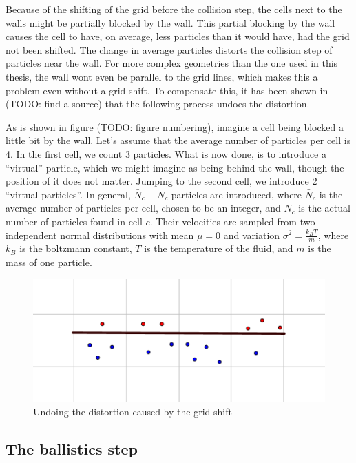 \documentclass[
]{article}
\begin{document}
Because of the shifting of the grid before the collision step, the cells
next to the walls might be partially blocked by the wall. This partial
blocking by the wall causes the cell to have, on average, less particles
than it would have, had the grid not been shifted. The change in average
particles distorts the collision step of particles near the wall. For
more complex geometries than the one used in this thesis, the wall wont
even be parallel to the grid lines, which makes this a problem even
without a grid shift. To compensate this, it has been shown in (TODO:
find a source) that the following process undoes the distortion.

As is shown in figure (TODO: figure numbering), imagine a cell being
blocked a little bit by the wall. Let's assume that the average number
of particles per cell is 4. In the first cell, we count 3 particles.
What is now done, is to introduce a ``virtual'' particle, which we might
imagine as being behind the wall, though the position of it does not
matter. Jumping to the second cell, we introduce 2 ``virtual
particles''. In general, \(\bar N_c - N_c\) particles are introduced,
where \(\bar N_c\) is the average number of particles per cell, chosen
to be an integer, and \(N_c\) is the actual number of particles found in
cell \(c\). Their velocities are sampled from two independent normal
distributions with mean \(\mu = 0\) and variation
\(\sigma^2 = \frac{k_{B}T}{m}\), where \(k_{B}\) is the boltzmann
constant, \(T\) is the temperature of the fluid, and \(m\) is the mass
of one particle.

\begin{figure}
\centering
\includegraphics{Assets/Wall_stick_boundary_conditions_virtual_particles.png}
\caption{Undoing the distortion caused by the grid shift}
\end{figure}

\hypertarget{the-ballistics-step}{%
\subsection{The ballistics step}\label{the-ballistics-step}}
\end{document}
